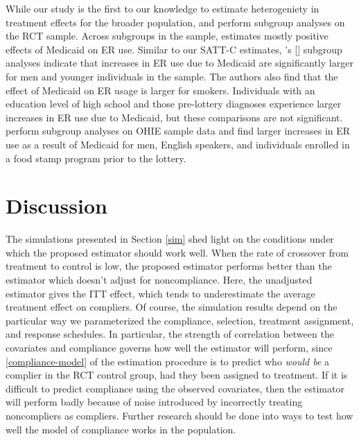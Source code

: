\documentclass[hidelinks,12pt]{article}
\newcommand{\possessivecite}[1]{\citeauthor{#1}'s [\citeyear{#1}]}
\begin{document}
{While our study is the first to our knowledge to estimate heterogeniety in treatment effects for the broader population, \citet{Taubman} and \citet{NBERw22363} perform subgroup analyses on the RCT sample. Across subgroups in the sample, \citet{Taubman} estimates mostly positive effects of Medicaid on ER use. Similar to our SATT-C estimates, \possessivecite{Taubman} subgroup analyses indicate that increases in ER use due to Medicaid are significantly larger for men and younger individuals in the sample. The authors also find that the effect of Medicaid on ER usage is larger for smokers. Individuals with an education level of high school and those pre-lottery diagnoses experience larger increases in ER use due to Medicaid, but these comparisons are not significant. \citet{NBERw22363} perform subgroup analyses on OHIE sample data and find larger increases in ER use as a result of Medicaid for men, English speakers, and individuals enrolled in a food stamp program prior to the lottery. 

\section{Discussion} \label{discussion}

The simulations presented in Section \ref{sim} shed light on the conditions under which the proposed estimator should work well. When the rate of crossover from treatment to control is low, the proposed estimator performs better than the estimator which doesn't adjust for noncompliance. Here, the unadjusted estimator gives the ITT effect, which tends to underestimate the average treatment effect on compliers. Of course, the simulation results depend on the particular way we parameterized the compliance, selection, treatment assignment, and response schedules. In particular, the strength of correlation between the covariates and compliance governs how well the estimator will perform, since \ref{compliance-model} of the estimation procedure is to predict who \textit{would be} a complier in the RCT control group, had they been assigned to treatment. If it is difficult to predict compliance using the observed covariates, then the estimator will perform badly because of noise introduced by incorrectly treating noncompliers as compliers. Further research should be done into ways to test how well the model of compliance works in the population. 

}
\end{document}

